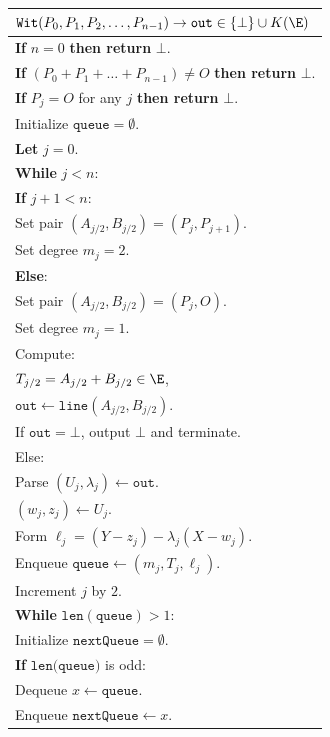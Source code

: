 \documentclass[11pt,letterpaper]{article}
\theoremstyle{definition}
\newcommand{\6}{\mathbf}
\newcommand{\7}{\mathcal}
\begin{document}
\begin{table}[H]
    \centering
    \begin{tabular}{|l|}
    \hline
    $\texttt{Wit}(P_0, P_1, P_2, \ldots, P_{n-1}) \to \texttt{out} \in \{\bot\} \cup K(\E)$ \\
    \hline
    \textbf{If} $n = 0$ \textbf{then return} $\bot$. \\
    \textbf{If} $(P_0 + P_1 + \dots + P_{n-1}) \neq O$ \textbf{then return} $\bot$. \\
    \textbf{If} $P_j = O$ for any $j$ \textbf{then return} $\bot$. \\
    Initialize $\texttt{queue}=\emptyset$.\\


    \textbf{Let} $j = 0$.\\
    \textbf{While} $j < n$: \\
        \quad \textbf{If} $j+1 < n$: \\
        \quad\quad Set pair $(A_{j/2},B_{j/2}) = (P_{j}, P_{j+1})$.\\
        \quad\quad Set degree $m_j = 2$. \\
        \quad \textbf{Else}:\\
        \quad\quad Set pair $(A_{j/2},B_{j/2}) = (P_{j}, O)$.\\
        \quad\quad Set degree $m_j = 1$.\\
        \quad Compute:\\
        \quad\quad $T_{j/2} = A_{j/2} + B_{j/2} \in \E$,\\
        \quad\quad $\texttt{out}\leftarrow \texttt{line}(A_{j/2},B_{j/2})$.\\
        \quad\quad If $\texttt{out} = \bot$, output $\bot$ and terminate.\\
        \quad\quad Else: \\
        \quad\quad\quad Parse $(U_j, \lambda_j) \leftarrow \texttt{out}$. \\
        \quad\quad\quad $(w_j, z_j) \leftarrow U_j$. \\
        \quad \quad\quad Form $\ell_j = (Y-z_j) - \lambda_j(X-w_j)$. \\
        \quad Enqueue $\texttt{queue} \leftarrow (m_j, T_j, \ell_j)$.\\
        \quad Increment $j$ by $2$.\\
    \textbf{While} $\texttt{len}(\texttt{queue}) > 1$:\\
        \quad Initialize $\texttt{nextQueue} = \emptyset$.\\
        \quad \textbf{If} $\texttt{len(queue)}$ is odd:\\
        \quad\quad Dequeue $x \leftarrow \texttt{queue}$.\\
        \quad\quad Enqueue $\texttt{nextQueue} \leftarrow x$.\\


\end{tabular}
\end{table}
\end{document}
